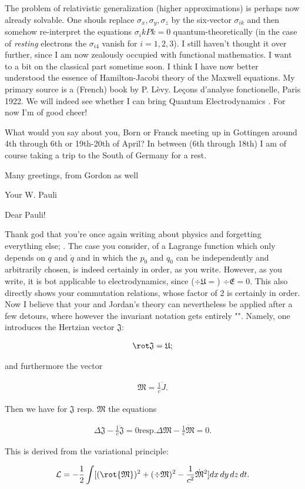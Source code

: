 \documentclass{article}
\newcommand{\nc}[2]{
  \newcommand{#1}{#2}
}
\newcommand{\rc}[2]{
  \renewcommand{#1}{#2}
}
\newcommand{\uequ}[1]{
\begin{align*}
#1
\end{align*}
}
\begin{document}
The problem of relativistic generalization (higher approximations) is perhaps now already solvable. One shouls replace $\sigma_x,\sigma_y,\sigma_z$ by the six-vector $\sigma_{ik}$ and then somehow re-interpret the equations $\sigma_ik Pk = 0$ quantum-theoretically (in the case of \textit{resting} electrons the $\sigma_{i4}$ vanish for $i=1,2,3$). I still haven't thought it over further, since I am now zealously occupied with functional mathematics. I want to  a bit on the classical part sometime soon. I think I have now better understood the essence of Hamilton-Jacobi theory of the Maxwell equations. My primary source is a (French) book by P. L\`evy. Leçons d'analyse fonctionelle, Paris 1922. We will indeed see whether I can bring Quantum Electrodynamics . For now I'm of good cheer!

What would you say about you, Born or Franck meeting up in Gottingen around 4th through 6th or 19th-20th of April? In between (6th through 18th) I am of course taking a trip to the South of Germany for a rest.

Many greetings, from Gordon as well

Your W. Pauli

\date{June 3, 1927}

\nc{\J}{\mathfrak{J}}
\nc{\M}{\mathfrak{M}}
\nc{\U}{\mathfrak{U}}
\rc{\L}{\mathcal{L}}
\rc{\H}{\mathcal{H}}
\nc{\B}{\mathfrak{B}}
\nc{\E}{\mathfrak{E}}

Dear Pauli!

Thank god that you're once again writing about physics and forgetting everything else; . The case you consider, of a Lagrange function which only depends on $q$ and $\dot{q}$ and in which the $p_0$ and $q_0$ can be independently and arbitrarily chosen, is indeed certainly in order, as you write. However, as you write, it is bot applicable to electrodynamics, since ($\div\mathfrak{U}=$) $\div\mathfrak{E}=0$. This also directly shows your commutation relations, whose factor of 2 is certainly in order. Now I believe that your and Jordan's theory can nevertheless be applied after a few detours, where however the invariant notation gets entirely "". Namely, one introduces the Hertzian vector $\J$:
\uequ{
\rot\J = \U;
}
and furthermore the vector
\uequ{
\M=\frac{1}{c}\dot{J}.
}
Then we have for $\J$ resp. $\M$ the equations
\uequ{
\Delta\J - \frac{1}{c} \ddot{\J} = 0 \text{resp.} 
\Delta\M - \frac{1}{c} \ddot{\M} = 0.
}
This is derived from the variational principle:
\uequ{
\L = -\frac{1}{2}\int[(\rot{\M})^2 + (\div\M)^2 - \frac{1}{c^2} \dot{\M}^2]dx\,dy\,dz\,dt.
}
\end{document}
